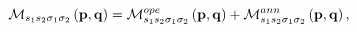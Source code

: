 \begin{equation}
\mathcal{M}_{s_{1}s_{2}\sigma _{1}\sigma _{2}}\left( \mathbf{p,q}\right) =%
\mathcal{M}_{s_{1}s_{2}\sigma _{1}\sigma _{2}}^{ope}\left( \mathbf{p,q}%
\right) +\mathcal{M}_{s_{1}s_{2}\sigma _{1}\sigma _{2}}^{ann}\left( \mathbf{%
p,q}\right) ,
\end{equation}

